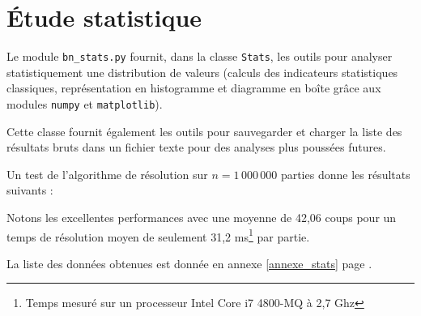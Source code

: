 \newpage

\section{Étude statistique}
Le module \texttt{bn\_stats.py} fournit, dans la classe \texttt{Stats}, les outils pour analyser statistiquement une distribution de valeurs (calculs des indicateurs statistiques classiques, représentation en histogramme et diagramme en boîte grâce aux modules \texttt{numpy} et \texttt{matplotlib}).

Cette classe fournit également les outils pour sauvegarder et charger la liste des résultats bruts dans un fichier texte pour des analyses plus poussées futures.

Un test de l'algorithme de résolution sur $n=1\,000\,000$ parties donne les résultats suivants :

\begin{center}\label{histo_algo}
\end{center}

Notons les excellentes performances avec une moyenne de 42,06 coups pour un temps de résolution moyen de seulement 31,2 ms\footnote{Temps mesuré sur un processeur Intel Core i7 4800-MQ à 2,7 Ghz} par partie.

La liste des données obtenues est donnée en annexe \ref{annexe_stats} page \pageref{annexe_stats}.

